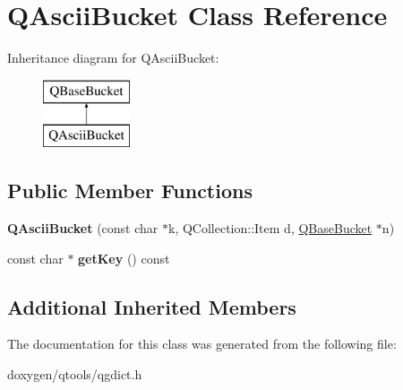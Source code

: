 \hypertarget{class_q_ascii_bucket}{}\section{Q\+Ascii\+Bucket Class Reference}
\label{class_q_ascii_bucket}
Inheritance diagram for Q\+Ascii\+Bucket\+:\begin{figure}[H]
\begin{center}
\leavevmode
\includegraphics[height=2.000000cm]{class_q_ascii_bucket}
\end{center}
\end{figure}
\subsection*{Public Member Functions}
\begin{DoxyCompactItemize}
\item 
\mbox{\label{class_q_ascii_bucket_af051ac533087e9ed8b0c78e5264e4a05}} 
{\bfseries Q\+Ascii\+Bucket} (const char $\ast$k, Q\+Collection\+::\+Item d, \mbox{\hyperlink{class_q_base_bucket}{Q\+Base\+Bucket}} $\ast$n)
\item 
\mbox{\label{class_q_ascii_bucket_ad56f60a60387145ed1ff7a49cea70feb}} 
const char $\ast$ {\bfseries get\+Key} () const
\end{DoxyCompactItemize}
\subsection*{Additional Inherited Members}


The documentation for this class was generated from the following file\+:\begin{DoxyCompactItemize}
\item 
doxygen/qtools/qgdict.\+h\end{DoxyCompactItemize}
